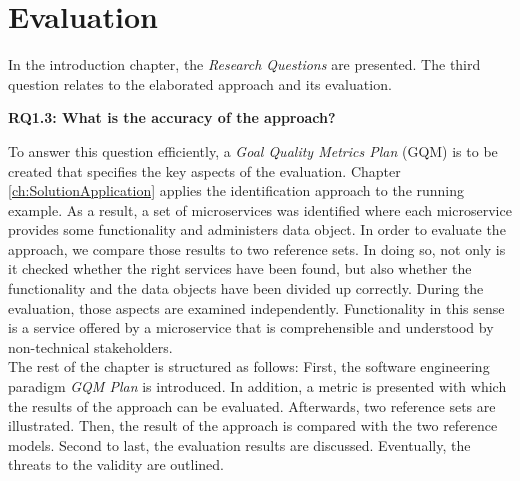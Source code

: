 \chapter{Evaluation}
\label{ch:Evalutation}
In the introduction chapter, the \textit{Research Questions} are presented. The third question relates to the elaborated approach and its evaluation. 


\vspace{0.5cm}
\par
\begingroup
\leftskip=1cm
\rightskip=1cm

\noindent
\textbf{RQ1.3: What is the accuracy of the approach? }

\endgroup
\vspace{0.5cm}

\noindent
To answer this question efficiently, a \textit{Goal Quality Metrics Plan } (GQM) is to be created that specifies the key aspects of the evaluation. 
Chapter \ref{ch:SolutionApplication} applies the identification approach to the running example. As a result, a set of microservices was identified where each microservice provides some functionality and administers data object.
In order to evaluate the approach, we compare those results to two reference sets. In doing so, not only is it checked whether the right services have been found, but also whether the functionality and the data objects have been divided up correctly. During the evaluation, those aspects are examined independently. Functionality in this sense is a service offered by a microservice that is comprehensible and understood by non-technical stakeholders. 
\\
The rest of the chapter is structured as follows: First, the software engineering paradigm \textit{GQM Plan} is introduced. In addition, a metric is presented with which the results of the approach can be evaluated. Afterwards, two reference sets are illustrated. Then, the result of the approach is compared with the two reference models. Second to last, the evaluation results are discussed. Eventually, the threats to the validity are outlined.


